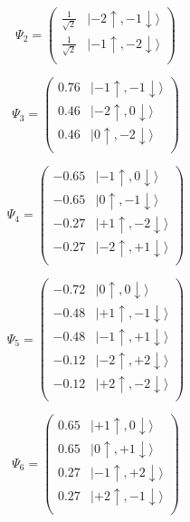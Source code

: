 \documentclass{article}
\begin{document}
\begin{equation}
\Psi_{2} = 
\begin{pmatrix}
\frac{1}{\sqrt{2}}  &  |-2\uparrow , -1\downarrow\rangle  \\
\frac{1}{\sqrt{2}}  &  |-1\uparrow , -2\downarrow\rangle  \\
\end{pmatrix}
\end{equation}

\begin{equation}
\Psi_{3} = 
\begin{pmatrix}
      0.76  &  |-1\uparrow , -1\downarrow\rangle  \\
      0.46  &  |-2\uparrow , 0\downarrow\rangle  \\
      0.46  &  |0\uparrow , -2\downarrow\rangle  \\
\end{pmatrix}
\end{equation}

\begin{equation}
\Psi_{4} = 
\begin{pmatrix}
-      0.65  &  |-1\uparrow , 0\downarrow\rangle  \\
-      0.65  &  |0\uparrow , -1\downarrow\rangle  \\
-      0.27  &  |+1\uparrow , -2\downarrow\rangle  \\
-      0.27  &  |-2\uparrow , +1\downarrow\rangle  \\
\end{pmatrix}
\end{equation}

\begin{equation}
\Psi_{5} = 
\begin{pmatrix}
-      0.72  &  |0\uparrow , 0\downarrow\rangle  \\
-      0.48  &  |+1\uparrow , -1\downarrow\rangle  \\
-      0.48  &  |-1\uparrow , +1\downarrow\rangle  \\
-      0.12  &  |-2\uparrow , +2\downarrow\rangle  \\
-      0.12  &  |+2\uparrow , -2\downarrow\rangle  \\
\end{pmatrix}
\end{equation}

\begin{equation}
\Psi_{6} = 
\begin{pmatrix}
      0.65  &  |+1\uparrow , 0\downarrow\rangle  \\
      0.65  &  |0\uparrow , +1\downarrow\rangle  \\
      0.27  &  |-1\uparrow , +2\downarrow\rangle  \\
      0.27  &  |+2\uparrow , -1\downarrow\rangle  \\
\end{pmatrix}
\end{equation}
\end{document}

